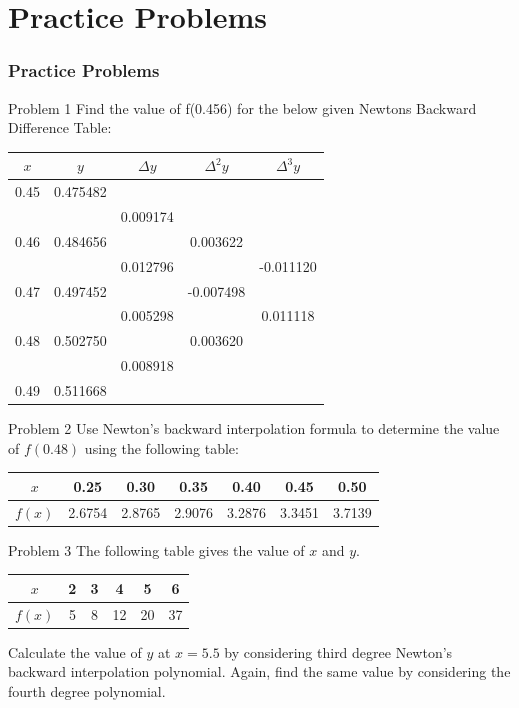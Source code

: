 \documentclass{beamer}
\begin{document}
\section{Practice Problems}
\begin{frame}
\frametitle{Practice Problems}
\begin{block}{Problem 1}
Find the value of f(0.456) for the below given Newtons Backward Difference Table:
\begin{center}
\begin{tabular}{|c|c|c|c|c|}
\hline
$x$ & $y$ & $\Delta y$ & $\Delta^{2} y$ & $\Delta^{3} y$ \\
\hline
0.45 & 0.475482 &  &  &  \\
\hline
 &  & 0.009174 &  &  \\
\hline
0.46 & 0.484656 &  & 0.003622 &  \\
\hline
 &  & 0.012796 &  & -0.011120 \\
\hline 
0.47 & 0.497452 &  & -0.007498 &  \\
\hline
 &  & 0.005298 &  & 0.011118 \\
\hline
0.48 & 0.502750 &  & 0.003620 &  \\
\hline
&  & 0.008918 &  &  \\
\hline 
0.49 & 0.511668 &  &  &  \\
\hline
\end{tabular}
\end{center}
\end{block}
\end{frame}
\begin{frame}{}

\begin{block}{Problem 2}
Use Newton's backward interpolation formula to determine the value of $f(0.48)$ using the following table:

\begin{tabular}{|c|c|c|c|c|c|c|}
\hline
$x$ &  0.25 & 0.30 & 0.35 & 0.40 & 0.45 & 0.50 \\
\hline
$f(x)$ & 2.6754 & 2.8765 & 2.9076 & 3.2876 & 3.3451 & 3.7139 \\
\hline
\end{tabular}
\end{block}

\begin{block}{Problem 3}
The following table gives the value of $x$ and $y$.

\begin{center}
\begin{tabular}{|c|c|c|c|c|c|}
\hline
$x$ & 2 & 3 & 4 & 5 & 6 \\
\hline
$f(x)$ & 5 & 8 & 12 & 20 & 37 \\
\hline
\end{tabular}
\end{center}

Calculate the value of $y$ at $x=5.5$ by considering third degree Newton's backward interpolation polynomial. Again, find the same value by considering the fourth degree polynomial.
\end{block}
\end{frame}
\end{document}
